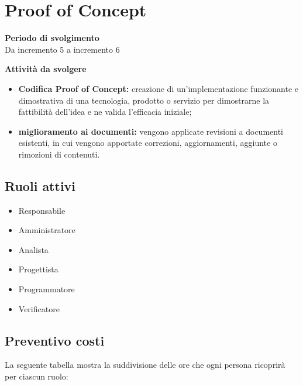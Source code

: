 \section{Proof of Concept}

\textbf{Periodo di svolgimento}
\\ Da incremento 5 a incremento 6

\textbf{Attività da svolgere}
    \begin{itemize}
        \item \textbf{Codifica Proof of Concept:} creazione di un'implementazione funzionante e dimostrativa di una tecnologia, prodotto o servizio per dimostrarne la fattibilità dell'idea e ne valida l'efficacia iniziale; 
        \item \textbf{miglioramento ai documenti:} vengono applicate revisioni a documenti esistenti, in cui vengono apportate correzioni, aggiornamenti, aggiunte o rimozioni di contenuti.
    \end{itemize}

\subsection{Ruoli attivi}
\begin{itemize}
    \item Responsabile 
    \item Amministratore 
    \item Analista 
    \item Progettista 
    \item Programmatore 
    \item Verificatore 
\end{itemize}

\subsection{Preventivo costi}

La seguente tabella mostra la suddivisione delle ore che ogni persona ricoprirà per ciascun ruolo:

